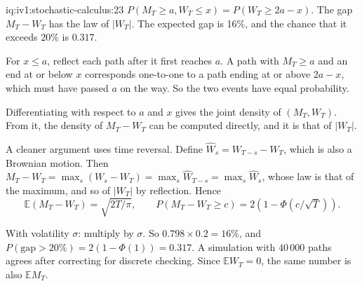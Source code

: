 \begin{solution}{iq:iv1:stochastic-calculus:23}
$P(M_T \ge a, W_T \le x) = P(W_T \ge 2a - x)$. The gap $M_T - W_T$ has the law of $|W_T|$. The expected gap is 16\%, and the chance that it exceeds 20\% is $0.317$.

For $x \le a$, reflect each path after it first reaches $a$. A path with $M_T \ge a$ and an end at or below $x$ corresponds one-to-one to a path ending at or above $2a - x$, which must have passed $a$ on the way. So the two events have equal probability.

Differentiating with respect to $a$ and $x$ gives the joint density of $(M_T, W_T)$. From it, the density of $M_T - W_T$ can be computed directly, and it is that of $|W_T|$.

A cleaner argument uses time reversal. Define $\hat{W}_s = W_{T - s} - W_T$, which is also a Brownian motion. Then $M_T - W_T = \max_s(W_s - W_T) = \max_s\hat{W}_{T - s} = \max_s\hat{W}_s$, whose law is that of the maximum, and so of $|W_T|$ by reflection. Hence
\[
\mathbb{E}(M_T - W_T) = \sqrt{2T/\pi}, \qquad P(M_T - W_T \ge c) = 2(1 - \Phi(c/\sqrt{T})).
\]

With volatility $\sigma$: multiply by $\sigma$. So $0.798 \times 0.2 = 16\%$, and $P(\text{gap} > 20\%) = 2(1 - \Phi(1)) = 0.317$. A simulation with $40\,000$ paths agrees after correcting for discrete checking. Since $\mathbb{E}W_T = 0$, the same number is also $\mathbb{E}M_T$.



\end{solution}

